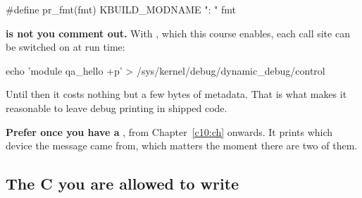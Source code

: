 \begin{ccode}
#define pr_fmt(fmt) KBUILD_MODNAME ": " fmt
\end{ccode}

\noindent \textbf{ is not  you comment out.} With
, which this course enables, each call site can be switched on at run
time:

\begin{shell}
echo 'module qa_hello +p' > /sys/kernel/debug/dynamic_debug/control
\end{shell}

\noindent Until then it costs nothing but a few bytes of metadata. That is what makes it reasonable
to leave debug printing in shipped code.

\textbf{Prefer  once you have a }, from Chapter~\ref{c10:ch}
onwards. It prints which device the message came from, which matters the moment there are two of
them.

\subsection{The C you are allowed to write}
\label{c4:app:a8}

